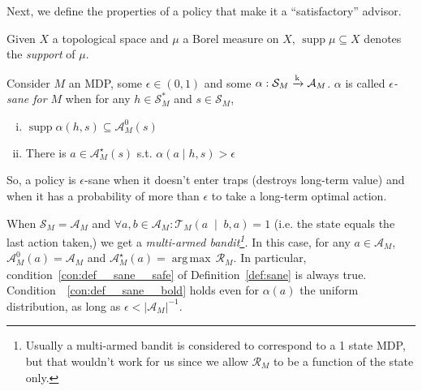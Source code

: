 \documentclass[anon,12pt]{colt2018} %
\DeclareMathOperator{\Supp}{supp}
\newcommand{\AP}[1]{\left(#1\right)}
\newcommand{\APM}[2]{\left(#1\;\middle\vert\;#2\right)}
\newcommand{\Argmax}[1]{\underset{#1}{\operatorname{arg\,max}}\,}
\newcommand{\Abs}[1]{\left\vert #1 \right\vert}
\newcommand{\K}{\xrightarrow{\textnormal{k}}}
\newcommand{\A}{\mathcal{A}}
\newcommand{\St}{\mathcal{S}}
\newcommand{\T}{\mathcal{T}}
\newcommand{\R}{\mathcal{R}}
\newcommand{\Ad}{\alpha}
\begin{document}
Next, we define the properties of a policy that make it a \enquote{satisfactory} advisor.

Given $X$ a topological space and $\mu$ a Borel measure on $X$, $\Supp{\mu} \subseteq X$ denotes the \emph{support} of $\mu$.

\begin{samepage}
\begin{definition}
\label{def:sane}

Consider $M$ an MDP, some $\epsilon\in(0,1)$ and some $\Ad: \St_M \K \A_M$. $\Ad$ is called \emph{$\epsilon$-sane for $M$} when for any $h \in \St_M^*$ and $s \in \St_M$,

\begin{enumerate}[i.]
\item\label{con:def__sane__safe} $\Supp{\Ad(h,s)} \subseteq \A_M^0\AP{s}$
\item\label{con:def__sane__bold} There is $a \in \A_M^\star(s)$ s.t. $\Ad(a \mid h,s) > \epsilon$
\end{enumerate}

So, a policy is $\epsilon$-sane when it doesn't enter traps (destroys long-term value) and when it has a probability of more than $\epsilon$ to take a long-term optimal action.

\end{definition}
\end{samepage}

\begin{samepage}
\begin{example}

When $\St_M=\A_M$ and $\forall a,b \in \A_M: \T_M\APM{a}{b,a}=1$ (i.e. the state equals the last action taken,) we get a \emph{multi-armed bandit\footnote{Usually a multi-armed bandit is considered to correspond to a 1 state MDP, but that wouldn't work for us since we allow $\R_M$ to be a function of the state only.}.} In this case, for any $a\in\A_M$, $\A_M^0(a) = \A_M$ and $\A_M^\star(a)=\Argmax{}{\R_M}$. In particular, condition~\ref{con:def__sane__safe} of Definition~\ref{def:sane} is always true. Condition~~\ref{con:def__sane__bold} holds even for $\alpha(a)$ the uniform distribution, as long as $\epsilon < \Abs{\A_M}^{-1}$.

\end{example}
\end{samepage}
\end{document}
